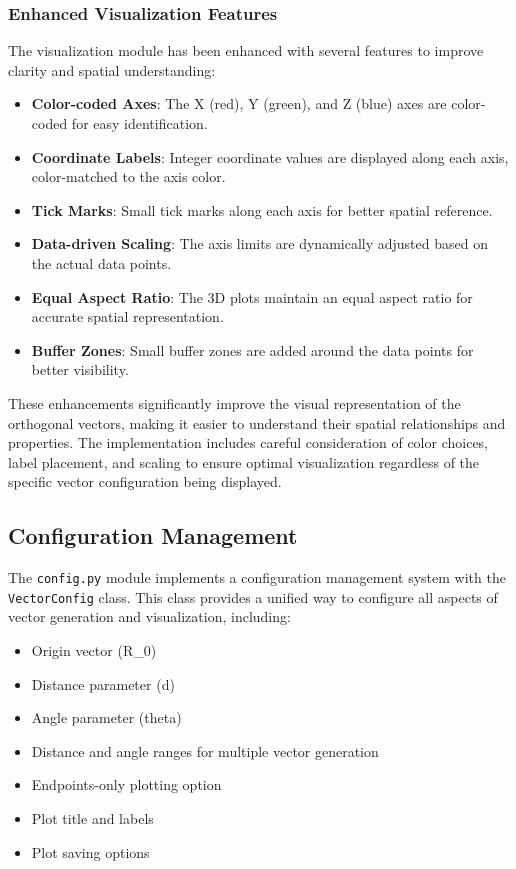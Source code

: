 \subsubsection{Enhanced Visualization Features}

The visualization module has been enhanced with several features to improve clarity and spatial understanding:

\begin{itemize}
    \item \textbf{Color-coded Axes}: The X (red), Y (green), and Z (blue) axes are color-coded for easy identification.
    \item \textbf{Coordinate Labels}: Integer coordinate values are displayed along each axis, color-matched to the axis color.
    \item \textbf{Tick Marks}: Small tick marks along each axis for better spatial reference.
    \item \textbf{Data-driven Scaling}: The axis limits are dynamically adjusted based on the actual data points.
    \item \textbf{Equal Aspect Ratio}: The 3D plots maintain an equal aspect ratio for accurate spatial representation.
    \item \textbf{Buffer Zones}: Small buffer zones are added around the data points for better visibility.
\end{itemize}

These enhancements significantly improve the visual representation of the orthogonal vectors, making it easier to understand their spatial relationships and properties. The implementation includes careful consideration of color choices, label placement, and scaling to ensure optimal visualization regardless of the specific vector configuration being displayed.

\subsection{Configuration Management}

The \texttt{config.py} module implements a configuration management system with the \texttt{VectorConfig} class. This class provides a unified way to configure all aspects of vector generation and visualization, including:

\begin{itemize}
    \item Origin vector (R\_0)
    \item Distance parameter (d)
    \item Angle parameter (theta)
    \item Distance and angle ranges for multiple vector generation
    \item Endpoints-only plotting option
    \item Plot title and labels
    \item Plot saving options
\end{itemize}

